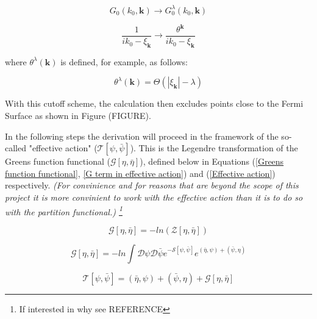 \documentclass[12pt]{article}
\begin{document}
\begin{equation} \label{propagator transform 1}
    G_0(k_0, \textbf{k}) \rightarrow G_0^{\lambda}(k_0, \textbf{k})
\end{equation}


\begin{equation} \label{propagator transform 2}
    \frac{1}{ik_0 - \xi_{\textbf{k}}} \rightarrow \frac{\theta^{\textbf{k}}}{ik_0 - \xi_{\textbf{k}}}
\end{equation}

\noindent where $\theta^{\lambda}(\textbf{k})$ is defined, for example, as follows:

\begin{equation} \label{theta def}
    \theta^{\lambda}(\textbf{k}) = \Theta(|\xi_{\textbf{k}}| - \lambda)    
\end{equation}

\noindent With this cutoff scheme, the calculation then excludes points close to the Fermi Surface as shown in Figure (FIGURE). \par
\medskip
\noindent In the following steps the derivation will proceed in the framework of the  so-called "effective action" ($\mathcal{T}[\psi, \bar{\psi}]$).
This is the Legendre transformation of the Greens function functional ($\mathcal{G}[\eta, \bar{\eta}]$), defined below in Equations (\ref{Greens function functional}, \ref{G term in effective action}) and (\ref{Effective action}) respectively. 
\textit{(For convinience and for reasons that
are beyond the scope of this project it is more convinient to work with the effective action than it is to do so with the partition functional.) \footnote{If interested in why see REFERENCE}}

\begin{equation} \label{Greens function functional}
    \mathcal{G}[\eta, \bar{\eta}] = -ln(\mathcal{Z}[\eta, \bar{\eta}])
\end{equation}

\begin{equation}\label{G term in effective action}
    \mathcal{G}[\eta, \bar{\eta}] = 
    -ln \int{\mathcal{D}\psi \mathcal{D} \bar{\psi}e^{-\mathcal{S}[\psi, \bar{\psi}]}e^{(\bar{\eta}, \psi) +(\bar{\psi}, \eta)}}
\end{equation}

\begin{equation} \label{Effective action}
    \mathcal{T}[\psi, \bar{\psi}] = (\bar{\eta},\psi) + (\bar{\psi},\eta) + \mathcal{G}[\eta, \bar{\eta}]
\end{equation}
\end{document}

